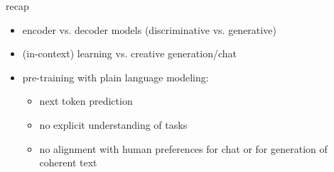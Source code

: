 
\begin{frame}{recap}

\vfill

\begin{itemize}
    \item encoder vs. decoder models (discriminative vs. generative)
    \item (in-context) learning vs. creative generation/chat
    \item pre-training with plain language modeling:
        \begin{itemize}
            \item next token prediction
            \item no explicit understanding of tasks
            \item no alignment with human preferences for
    chat or for generation of coherent text
        \end{itemize}
\end{itemize}

\vfill

\end{frame}


%
%	
%
%


%
%
%
%

